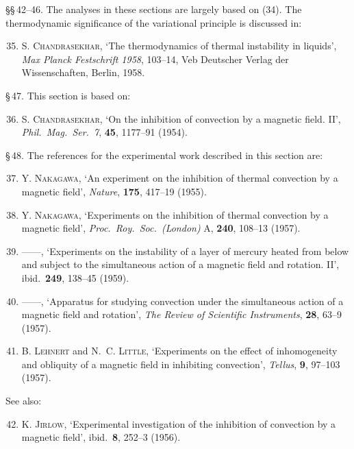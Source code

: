 \S\S\,42--46. The analyses in these sections are largely based on (34). The thermodynamic significance of the variational principle is discussed in:
\begin{enumerate}
\setcounter{enumi}{34}
\item S. \textsc{Chandrasekhar}, `The thermodynamics of thermal instability in liquids', \emph{Max Planck Festschrift 1958}, 103--14, Veb Deutscher Verlag der Wissenschaften, Berlin, 1958.
\end{enumerate}

\S\,47. This section is based on:
\begin{enumerate}
\setcounter{enumi}{35}
\item S. \textsc{Chandrasekhar}, `On the inhibition of convection by a magnetic field. II', \emph{Phil.\ Mag.\ Ser.\ 7}, \textbf{45}, 1177--91 (1954).
\end{enumerate}

\S\,48. The references for the experimental work described in this section are:
\begin{enumerate}
\setcounter{enumi}{36}
\item Y. \textsc{Nakagawa}, `An experiment on the inhibition of thermal convection by a magnetic field', \emph{Nature}, \textbf{175}, 417--19 (1955).
\item Y. \textsc{Nakagawa}, `Experiments on the inhibition of thermal convection by a magnetic field', \emph{Proc.\ Roy.\ Soc.\ (London)} A, \textbf{240}, 108--13 (1957).
\item ------, `Experiments on the instability of a layer of mercury heated from below and subject to the simultaneous action of a magnetic field and rotation. II', ibid.\ \textbf{249}, 138--45 (1959).
\item ------, `Apparatus for studying convection under the simultaneous action of a magnetic field and rotation', \emph{The Review of Scientific Instruments}, \textbf{28}, 63--9 (1957).
\item B. \textsc{Lehnert} and N.~C. \textsc{Little}, `Experiments on the effect of inhomogeneity and obliquity of a magnetic field in inhibiting convection', \emph{Tellus}, \textbf{9}, 97--103 (1957).
\end{enumerate}

See also:
\begin{enumerate}
\setcounter{enumi}{41}
\item K. \textsc{Jirlow}, `Experimental investigation of the inhibition of convection by a magnetic field', ibid.\ \textbf{8}, 252--3 (1956).
\end{enumerate}


